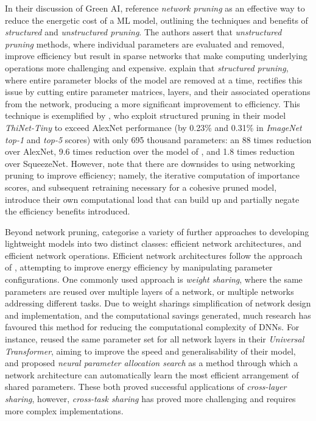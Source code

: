 \documentclass[a4paper, 12pt]{article}
\begin{document}
    In their discussion of Green AI, \citet{xu-2021} reference \emph{network pruning} as an effective way to reduce the energetic cost of a ML model, outlining the techniques and benefits of \emph{structured} and \emph{unstructured pruning}. The authors assert that \emph{unstructured pruning} methods, where individual parameters are evaluated and removed, improve efficiency but result in sparse networks that make computing underlying operations more challenging and expensive. \citet{xu-2021} explain that \emph{structured pruning}, where entire parameter blocks of the model are removed at a time, rectifies this issue by cutting entire parameter matrices, layers, and their associated operations from the network, producing a more significant improvement to efficiency. This technique is exemplified by \citet{luo-2019}, who exploit structured pruning in their model \emph{ThiNet-Tiny} to exceed AlexNet performance (by 0.23\% and 0.31\% in \emph{ImageNet top-1} and \emph{top-5} scores) with only 695 thousand parameters: an 88 times reduction over AlexNet, 9.6 times reduction over the model of \citet{han-2015}, and 1.8 times reduction over SqueezeNet. However, \citet{xu-2021} note that there are downsides to using networking pruning to improve efficiency; namely, the iterative computation of importance scores, and subsequent retraining necessary for a cohesive pruned model, introduce their own computational load that can build up and partially negate the efficiency benefits introduced.

    Beyond network pruning, \citet{xu-2021} categorise a variety of further approaches to developing lightweight models into two distinct classes: efficient network architectures, and efficient network operations. Efficient network architectures follow the approach of \citet{han-2015}, attempting to improve energy efficiency by manipulating parameter configurations. One commonly used approach is \emph{weight sharing}, where the same parameters are reused over multiple layers of a network, or multiple networks addressing different tasks. Due to weight sharings simplification of network design and implementation, and the computational savings generated, much research has favoured this method for reducing the computational complexity of DNNs. For instance, \citet{dehghani-2018} reused the same parameter set for all network layers in their \emph{Universal Transformer}, aiming to improve the speed and generalisability of their model, and \citet{plummer-2020} proposed \emph{neural parameter allocation search} as a method through which a network architecture can automatically learn the most efficient arrangement of shared parameters. These both proved successful applications of \emph{cross-layer sharing}, however, \emph{cross-task sharing} has proved more challenging and requires more complex implementations. 
\end{document}
